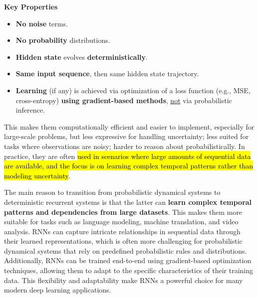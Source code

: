 \begin{itemize}
    \textcolor{Green3}{ \textbf{Key Properties}}
    \begin{itemize}
        \item \textbf{No noise} terms.
        \item \textbf{No probability} distributions.
        \item \textbf{Hidden state} evolves \textbf{deterministically}.
        \item \textbf{Same input sequence}, then same hidden state trajectory.
        \item \textbf{Learning} (if any) is achieved via optimization of a loss function (e.g., MSE, cross-entropy) \textbf{using gradient-based methods}, \underline{not} via probabilistic inference.
    \end{itemize}
    This makes them computationally efficient and easier to implement, especially for large-scale problems, but less expressive for handling uncertainty; less suited for tasks where observations are noisy; harder to reason about probabilistically. In practice, they are often \hl{used in scenarios where large amounts of sequential data are available, and the focus is on learning complex temporal patterns rather than modeling uncertainty}.
\end{itemize}
The main reason to transition from probabilistic dynamical systems to deterministic recurrent systems is that the latter can \textbf{learn complex temporal patterns and dependencies from large datasets}. This makes them more suitable for tasks such as language modeling, machine translation, and video analysis. RNNs can capture intricate relationships in sequential data through their learned representations, which is often more challenging for probabilistic dynamical systems that rely on predefined probabilistic rules and distributions. Additionally, RNNs can be trained end-to-end using gradient-based optimization techniques, allowing them to adapt to the specific characteristics of their training data. This flexibility and adaptability make RNNs a powerful choice for many modern deep learning applications.